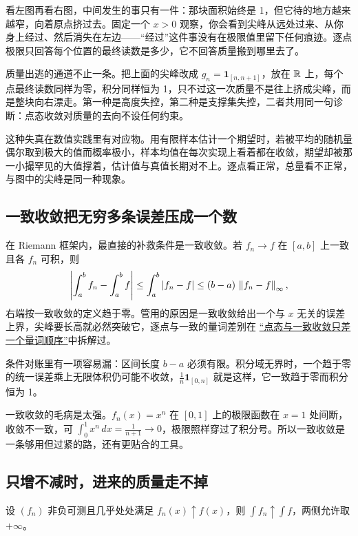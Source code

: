 看左图再看右图，中间发生的事只有一件：那块面积始终是 1，但它待的地方越来越窄，向着原点挤过去。固定一个 \(x>0\) 观察，你会看到尖峰从远处过来、从你身上经过、然后消失在左边——``经过''这件事没有在极限值里留下任何痕迹。逐点极限只回答每个位置的最终读数是多少，它不回答质量搬到哪里去了。

质量出逃的通道不止一条。把上面的尖峰改成 \(g_n=\mathbf1_{[n,n+1]}\)，放在 \(\mathbb{R}\) 上，每个点最终读数同样为零，积分同样恒为 1，只不过这一次质量不是往上挤成尖峰，而是整块向右漂走。第一种是高度失控，第二种是支撑集失控，二者共用同一句诊断：点态收敛对质量的去向不设任何约束。

这种失真在数值实践里有对应物。用有限样本估计一个期望时，若被平均的随机量偶尔取到极大的值而概率极小，样本均值在每次实现上看着都在收敛，期望却被那一小撮罕见的大值撑着，估计值与真值长期对不上。逐点看正常，总量看不正常，与图中的尖峰是同一种现象。

\subsection{一致收敛把无穷多条误差压成一个数}

在 Riemann 框架内，最直接的补救条件是一致收敛。若 \(f_n\to f\) 在 \([a,b]\) 上一致且各 \(f_n\) 可积，则
\[
\left|\int_a^b f_n-\int_a^b f\right|\le\int_a^b\left|f_n-f\right|\le(b-a)\,\left\lVert f_n-f\right\rVert_\infty,
\]
右端按一致收敛的定义趋于零。管用的原因是一致收敛给出一个与 \(x\) 无关的误差上界，尖峰要长高就必然突破它，逐点与一致的量词差别在 \hyperref[sec:12-Real-Analysis-Support/02-Convergence/02]{``点态与一致收敛只差一个量词顺序''}中拆解过。

条件对账里有一项容易漏：区间长度 \(b-a\) 必须有限。积分域无界时，一个趋于零的统一误差乘上无限体积仍可能不收敛，\(\frac1n\mathbf1_{[0,n]}\) 就是这样，它一致趋于零而积分恒为 1。

一致收敛的毛病是太强。\(f_n(x)=x^n\) 在 \([0,1]\) 上的极限函数在 \(x=1\) 处间断，收敛不一致，可 \(\int_0^1x^n\,dx=\frac1{n+1}\to0\)，极限照样穿过了积分号。所以一致收敛是一条够用但过紧的路，还有更贴合的工具。

\subsection{只增不减时，进来的质量走不掉}

\begin{theorem}[单调收敛定理]
设 \((f_n)\) 非负可测且几乎处处满足 \(f_n(x)\uparrow f(x)\)，则 \(\int f_n\uparrow\int f\)，两侧允许取 \(+\infty\)。
\end{theorem}

